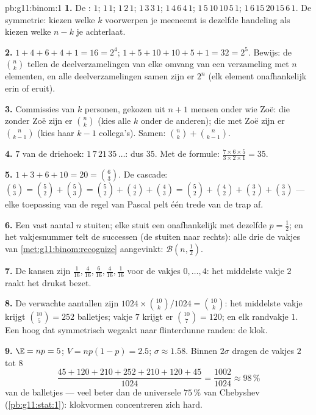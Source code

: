 \begin{solution}{pb:g11:binom:1}
\textbf{1.} De : $1$; $1\,1$; $1\,2\,1$; $1\,3\,3\,1$; $1\,4\,6\,4\,1$;
$1\,5\,10\,10\,5\,1$; $1\,6\,15\,20\,15\,6\,1$. De symmetrie: kiezen welke
$k$ voorwerpen je meeneemt is dezelfde handeling als kiezen welke $n - k$ je
achterlaat.

\textbf{2.} $1 + 4 + 6 + 4 + 1 = 16 = 2^4$;
$1 + 5 + 10 + 10 + 5 + 1 = 32 = 2^5$. Bewijs: de $\binom nk$ tellen de
deelverzamelingen van elke omvang van een verzameling met $n$ elementen, en
alle deelverzamelingen samen zijn er $2^n$ (elk element onafhankelijk erin of
eruit).

\textbf{3.} Commissies van $k$ personen, gekozen uit $n + 1$ mensen onder wie
Zoë: die zonder Zoë zijn er $\binom nk$ (kies alle $k$ onder de anderen); die
met Zoë zijn er $\binom{n}{k-1}$ (kies haar $k - 1$ collega's). Samen:
$\binom nk + \binom{n}{k-1}$.

\textbf{4.}  $7$ van de driehoek: $1\,7\,21\,35\,\dots$: dus $35$. Met de
formule: $\frac{7 \times 6 \times 5}{3 \times 2 \times 1} = 35$.

\textbf{5.} $1 + 3 + 6 + 10 = 20 = \binom63$. De cascade:
$\binom63 = \binom52 + \binom53 = \binom52 + \binom42 + \binom43
= \binom52 + \binom42 + \binom32 + \binom33$ --- elke toepassing van de regel
van Pascal pelt één trede van de trap af.

\textbf{6.} Een vast aantal $n$ stuiten; elke stuit een onafhankelijk
 met dezelfde $p = \frac12$; en het vakjesnummer telt de
successen (de stuiten naar rechts): alle drie de vakjes van
\cref{met:g11:binom:recognize} aangevinkt:
$\mathcal B\!\left(n, \frac12\right)$.

\textbf{7.} De kansen zijn $\frac{1}{16}, \frac{4}{16}, \frac{6}{16},
\frac{4}{16}, \frac{1}{16}$ voor de vakjes $0, \dots, 4$: het middelste vakje
$2$ raakt het drukst bezet.

\textbf{8.} De verwachte aantallen zijn
$1024 \times \binom{10}{k}/1024 = \binom{10}{k}$: het middelste vakje krijgt
$\binom{10}{5} = 252$ balletjes; vakje $7$ krijgt er $\binom{10}{7} = 120$;
en elk randvakje $1$. Een hoog  dat symmetrisch wegzakt naar
flinterdunne randen: de klok.

\textbf{9.} $\E = np = 5$; $V = np(1 - p) = 2.5$; $\sigma \approx 1.58$.
Binnen $2\sigma$ dragen de vakjes $2$ tot $8$
\[
\frac{45 + 120 + 210 + 252 + 210 + 120 + 45}{1024}
= \frac{1002}{1024} \approx 98\,\%
\]
van de balletjes --- veel beter dan de universele $75\,\%$ van Chebyshev
(\cref{pb:g11:stat:1}): klokvormen concentreren zich hard.


\end{solution}
